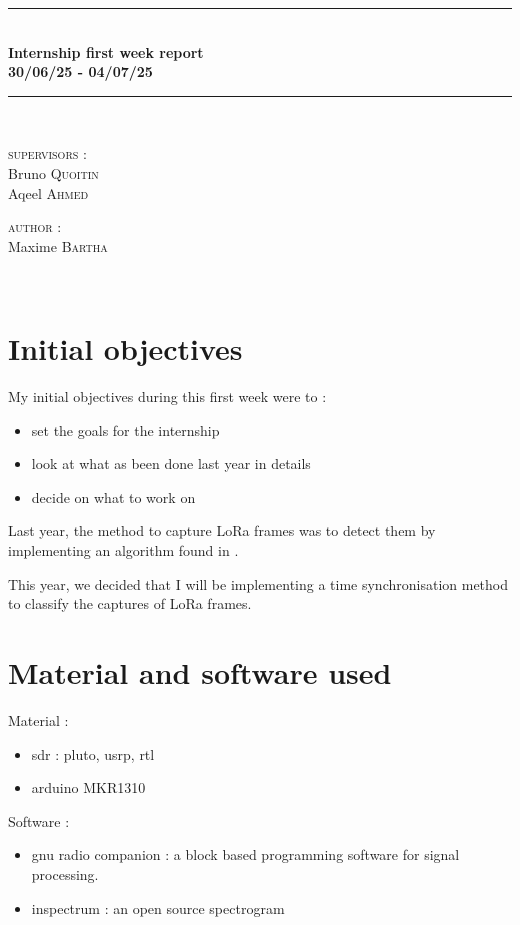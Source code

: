 \documentclass[a4paper, 12pt]{article}
\newcommand{\HRule}{\rule{\linewidth}{0.3mm}}
\begin{document}
\begin{center}
\HRule \\[0.3cm]
{ \LARGE \bfseries Internship first week report \\[0.3cm]}
{ \LARGE \bfseries 30/06/25 - 04/07/25 \\[0.1cm]}
\HRule \\[1.5cm]

\begin{minipage}[t]{0.45\textwidth}
\begin{flushleft} \large
\textsc{supervisors :}\\
Bruno \textsc{Quoitin}\\
Aqeel \textsc{Ahmed}\\
\end{flushleft}

\end{minipage}
\begin{minipage}[t]{0.45\textwidth}
\begin{flushright} \large
\textsc{author :}\\
Maxime \textsc{Bartha}\\
\end{flushright}
\end{minipage}\\[2ex]
\end{center}

\section{Initial objectives}
My initial objectives during this first week were to :
\begin{itemize}
  \item set the goals for the internship
  \item look at what as been done last year in details
  \item decide on what to work on
\end{itemize}


Last year, the method to capture LoRa frames was to detect them by implementing an algorithm found in \cite{demToDec}.

This year, we decided that I will be implementing a time synchronisation method to classify the captures of LoRa frames.

\section{Material and software used}
Material :
\begin{itemize}
  \item sdr : pluto, usrp, rtl
  \item arduino MKR1310
\end{itemize}
Software : 
\begin{itemize}
  \item gnu radio companion : a block based programming software for signal processing.
  \item inspectrum : an open source spectrogram

\end{itemize}
\end{document}
